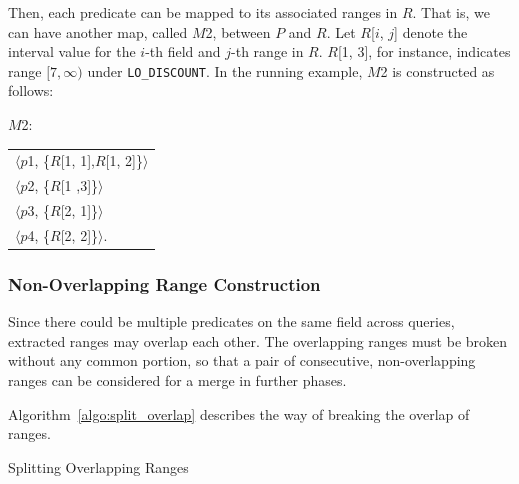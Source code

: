 \documentclass[runningheads]{comsis2}
\def\ropenrange#1{$[{#1})$}
\begin{document}
Then, each predicate can be mapped to its associated ranges in $R$. That is, 
we can have another map, called $M$2, between $P$ and $R$. 
Let $R$[$i$, $j$] denote the interval value for the $i$-th field and $j$-th range in $R$. 
$R$[1, 3], for instance, indicates range \ropenrange{7, \infty} under {\tt LO\_DISCOUNT}. 
In the running example, $M$2 is constructed as follows:

$M$2:
\begin{center}
\begin{tabular}{l}
$\langle${$p$1}, \{$R$[1, 1],$R$[1, 2]\}$\rangle$ \\
$\langle${$p$2}, \{$R$[1 ,3]\}$\rangle$ \\ 
$\langle${$p$3}, \{$R$[2, 1]\}$\rangle$ \\
$\langle${$p$4}, \{$R$[2, 2]\}$\rangle$. \\
\end{tabular}
\end{center} 

\subsubsection{Non-Overlapping Range Construction}

Since there could be multiple predicates on the same field across queries, 
extracted ranges may overlap each other. 
The overlapping ranges must be broken without any common portion, so that 
a pair of consecutive, \hbox{non-overlapping} ranges can be 
considered for a merge in further phases. 

Algorithm~\ref{algo:split_overlap} describes the way of breaking 
the \hbox{overlap} of ranges. 


\begin{algorithm}[h]
\caption{Splitting Overlapping Ranges}
\label{algo:split_overlap}
{
}
\end{algorithm}
\end{document}

